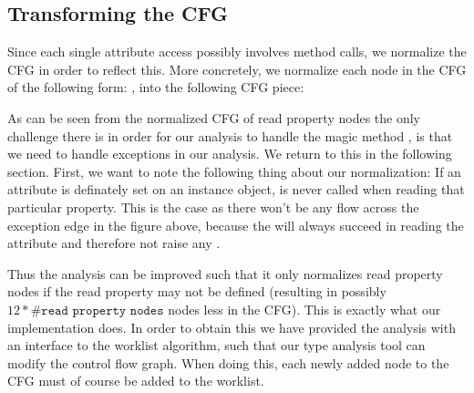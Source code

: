 \subsection{Transforming the CFG}
Since each single attribute access possibly involves method calls, we normalize the CFG in order to reflect this. More concretely, we normalize each node in the CFG of the following form: , into the following CFG piece:


As can be seen from the normalized CFG of read property nodes the only challenge there is in order for our analysis to handle the magic method , is that we need to handle exceptions in our analysis. We return to this in the following section. First, we want to note the following thing about our normalization: If an attribute is definately set on an instance object,  is never called when reading that particular property. This is the case as there won't be any flow across the exception edge in the figure above, because the  will always succeed in reading the attribute and therefore not raise any .

Thus the analysis can be improved such that it only normalizes read property nodes if the read property may not be defined (resulting in possibly $12 * \#\texttt{read property nodes}$ nodes less in the CFG). This is exactly what our implementation does. In order to obtain this we have provided the analysis with an interface to the worklist algorithm, such that our type analysis tool can modify the control flow graph. When doing this, each newly added node to the CFG must of course be added to the worklist.
